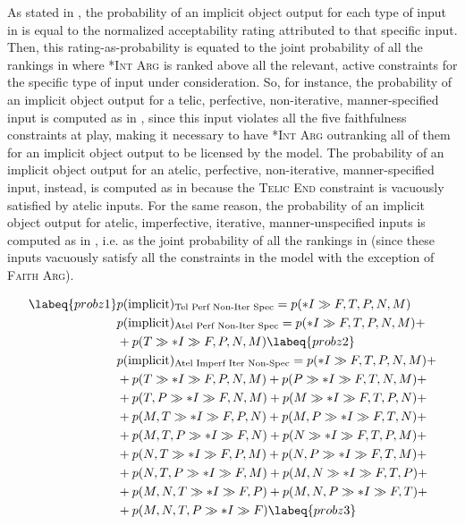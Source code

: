 As stated in , the probability of an implicit object output for each type of input in  is equal to the normalized acceptability rating attributed to that specific input. Then, this rating-as-probability is equated to the joint probability of all the rankings in  where \textsc{*Int Arg} is ranked above all the relevant, active constraints for the specific type of input under consideration. So, for instance, the probability of an implicit object output for a telic, perfective, non-iterative, manner-specified input is computed as in , since this input violates all the five faithfulness constraints at play, making it necessary to have \textsc{*Int Arg} outranking all of them for an implicit object output to be licensed by the model. The probability of an implicit object output for an atelic, perfective, non-iterative, manner-specified input, instead, is computed as in  because the \textsc{Telic End} constraint is vacuously satisfied by atelic inputs. For the same reason, the probability of an implicit object output for atelic, imperfective, iterative, manner-unspecified inputs is computed as in , i.e. as the joint probability of all the rankings in  (since these inputs vacuously satisfy all the constraints in the model with the exception of \textsc{Faith Arg}).

\begin{align}  \labeq{probz1}
    & p(\text{implicit})\textsubscript{Tel Perf Non-Iter Spec} = p(*I \gg {F, T, P, N, M}) \\
    & p(\text{implicit})\textsubscript{Atel Perf Non-Iter Spec} = p(*I \gg {F, T, P, N, M}) + \nonumber \\ & + p(T \gg *I \gg {F, P, N, M}) \labeq{probz2}\\
    & p(\text{implicit})\textsubscript{Atel Imperf Iter Non-Spec} = p(*I \gg {F, T, P, N, M}) + \nonumber \\ & + p(T \gg *I \gg {F, P, N, M}) + p(P \gg *I \gg {F, T, N, M}) + \nonumber \\ & + p({T, P} \gg *I \gg {F, N, M}) + p(M \gg *I \gg {F, T, P, N}) + \nonumber \\ & + p({M, T} \gg *I \gg {F, P, N}) + p({M, P} \gg *I \gg {F, T, N}) + \nonumber \\ & + p({M, T, P} \gg *I \gg {F, N}) + p(N \gg *I \gg {F, T, P, M}) + \nonumber \\ & + p({N, T} \gg *I \gg {F, P, M}) + p({N, P} \gg *I \gg {F, T, M}) + \nonumber \\ & + p({N, T, P} \gg *I \gg {F, M}) + p({M, N} \gg *I \gg {F, T, P}) + \nonumber \\ & + p({M, N, T} \gg *I \gg {F, P}) + p({M, N, P} \gg *I \gg {F, T}) + \nonumber \\ & + p({M, N, T, P} \gg *I \gg F) \labeq{probz3}
\end{align}

